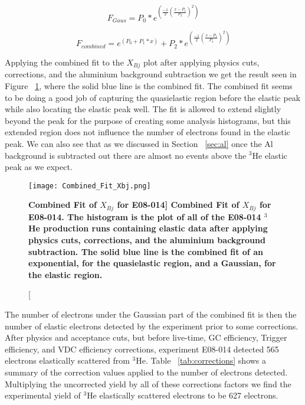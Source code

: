 \begin{equation} \label{eq:gaus}
	F_{Gaus} = P_0 * e^{\left( \frac{-1}{2} \left( \frac{x-P_1}{P_2} \right)^2 \right)}
\end{equation}

\begin{equation} \label{eq:combined}
	F_{combined} = e^{\left( P_0+P_1*x \right)} + P_2 * e^{\left( \frac{-1}{2} \left( \frac{x-P_3}{P_4} \right)^2 \right)}
\end{equation}

Applying the combined fit to the $X_{Bj}$ plot after applying physics cuts, corrections, and the aluminium background subtraction we get the result seen in Figure ~\ref{fig:combined}, where the solid blue line is the combined fit. The combined fit seems to be doing a good job of capturing the quasielastic region before the elastic peak while also locating the elastic peak well. The fit is allowed to extend slightly beyond the peak for the purpose of creating some analysis histograms, but this extended region does not influence the number of electrons found in the elastic peak. We can also see that as we discussed in Section ~\ref{sec:al} once the Al background is subtracted out there are almost no events above the $^3$He elastic peak as we expect. 

\begin{figure}[!ht]
\begin{center}
\texttt{[image: Combined\_Fit\_Xbj.png]}
\end{center}
\caption[\bf{Combined Fit of $X_{Bj}$ for E08-014}]{
{\bf{Combined Fit of $X_{Bj}$ for E08-014.}} The histogram is the plot of all of the E08-014 $^3$He production runs containing elastic data after applying physics cuts, corrections, and the aluminium background subtraction. The solid blue line is the combined fit of an exponential, for the quasielastic region, and a Gaussian, for the elastic region.}
\label{fig:combined}
\end{figure}

The number of electrons under the Gaussian part of the combined fit is then the number of elastic electrons detected by the experiment prior to some corrections. After physics and acceptance cuts, but before live-time, GC efficiency, Trigger efficiency, and VDC efficiency corrections, experiment E08-014 detected 565 electrons elastically scattered from $^3$He. Table ~\ref{tab:corrections} shows a summary of the correction values applied to the number of electrons detected. Multiplying the uncorrected yield by all of these corrections factors we find the experimental yield of $^3$He elastically scattered electrons to be 627 electrons.

